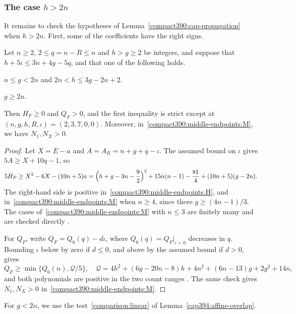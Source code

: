 \subsubsection{The case $h>2n$}
It remains to check the hypotheses of Lemma~\ref{compact390:cap-propagation} when $h>2n$. First, some of the coefficients have the right signs.

\begin{lemma}
\label{compact390:middle-endpoints}
\label{compact390:high-endpoints}
Let $n\ge2$, $2\le q=n-R\le n$ and
$h>g\ge2$ be integers, and suppose that $h+5\iota\le3n+4g-5q$, and that one of the following holds.
\begin{props}
\item $n\le g<2n$ and $2n<h\le3g-2n+2$.\label{compact390:middle-endpoints:M}
\item $g\ge2n$.\label{compact390:middle-endpoints:H}
\end{props}
Then $H_F\ge0$ and $Q_F>0$, and the first inequality is strict except at $(n,g,h,R,\iota)=(2,3,7,0,0)$.
Moreover, in~\ref{compact390:middle-endpoints:M}, we have $N_1,N_X>0$.
\end{lemma}
\begin{proof}
Let $X=E-a$ and $A=A_R=n+g+q-\iota$. The assumed bound on $\iota$ gives
$5A\ge X+10q-1$, so
\[
 5H_F\ge X^2-6X-(10n+5)a
 =\Bigl(h+g-3n-\frac92\Bigr)^2+15n(n-1)-\frac{81}4+(10n+5)(g-2n).
\]
The right-hand side is positive in~\ref{compact390:middle-endpoints:H},
and in~\ref{compact390:middle-endpoints:M} when $n\ge4$, since there
$g\ge(4n-1)/3$. The cases of~\ref{compact390:middle-endpoints:M} with
$n\le3$ are finitely many and are checked directly .

For $Q_F$, write $Q_F=Q_0(q)-d\iota$, where
$Q_0(q)=Q_F|_{\iota=0}$ decreases in $q$. Bounding $\iota$ below by zero if
$d\le0$, and above by the assumed bound if $d>0$, gives
\[
 Q_F\ge\min\{Q_0(n),\mathcal Q/5\},
 \quad\mathcal Q=4h^2+(6g-20n-8)h+4n^2+(6n-13)g+2g^2+14n,
\]
and both polynomials are positive in the two count ranges .
The same check gives $N_1,N_X>0$ in~\ref{compact390:middle-endpoints:M}.
\end{proof}

For $g<2n$, we use the test~\ref{comparison:linear} of Lemma~\ref{cap394:affine-overlap}.

